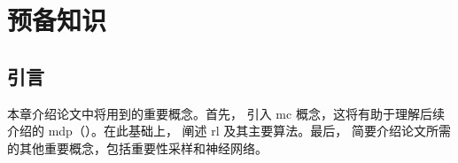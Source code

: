 \chapter{预备知识}
\label{chap:prelim}

\section{引言}
本章介绍论文中将用到的重要概念。首先， 引入 \glsdesc{mc} 概念，这将有助于理解后续介绍的 \glsdesc{mdp}（）。在此基础上， 阐述 \gls{rl} 及其主要算法。最后， 简要介绍论文所需的其他重要概念，包括重要性采样和神经网络。






